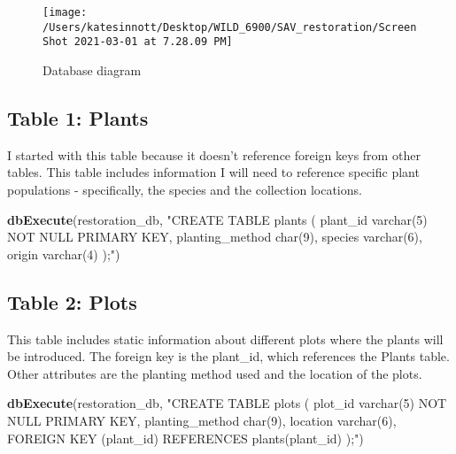 \documentclass[
]{book}
\newenvironment{Shaded}{\begin{snugshade}}{\end{snugshade}}
\newcommand{\KeywordTok}[1]{\textcolor[rgb]{0.13,0.29,0.53}{\textbf{#1}}}
\newcommand{\NormalTok}[1]{#1}
\newcommand{\StringTok}[1]{\textcolor[rgb]{0.31,0.60,0.02}{#1}}
\begin{document}
\begin{figure}

{\centering \texttt{[image: /Users/katesinnott/Desktop/WILD\_6900/SAV\_restoration/Screen Shot 2021-03-01 at 7.28.09 PM]} 

}

\caption{Database diagram}\label{fig:diagram}
\end{figure}

\hypertarget{table-1-plants}{%
\subsection{Table 1: Plants}\label{table-1-plants}}

I started with this table because it doesn't reference foreign keys from other tables. This table includes information I will need to reference specific plant populations -
specifically, the species and the collection locations.

\begin{Shaded}
\begin{Highlighting}[]
\KeywordTok{dbExecute}\NormalTok{(restoration_db, }\StringTok{"CREATE TABLE plants (}
\StringTok{          plant_id varchar(5) NOT NULL PRIMARY KEY,}
\StringTok{          planting_method char(9),}
\StringTok{          species varchar(6),}
\StringTok{          origin varchar(4)}
\StringTok{          );"}\NormalTok{)}
\end{Highlighting}
\end{Shaded}

\hypertarget{table-2-plots}{%
\subsection{Table 2: Plots}\label{table-2-plots}}

This table includes static information about different plots where the plants will be introduced. The foreign key is the plant\_id, which references the Plants table. Other attributes are the planting method used and the location of the plots.

\begin{Shaded}
\begin{Highlighting}[]
\KeywordTok{dbExecute}\NormalTok{(restoration_db, }\StringTok{"CREATE TABLE plots (}
\StringTok{          plot_id varchar(5) NOT NULL PRIMARY KEY,}
\StringTok{          planting_method char(9),}
\StringTok{          location varchar(6), }
\StringTok{          FOREIGN KEY (plant_id) REFERENCES plants(plant_id)}
\StringTok{          );"}\NormalTok{)}
\end{Highlighting}
\end{Shaded}
\end{document}
